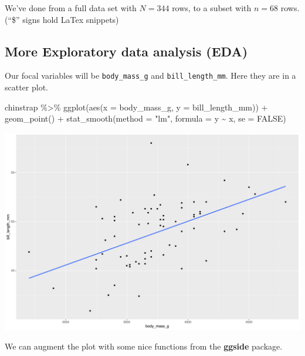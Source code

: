\documentclass[
  letterpaper,
  DIV=11,
  numbers=noendperiod]{scrartcl}
\newenvironment{Shaded}{\begin{snugshade}}{\end{snugshade}}
\newcommand{\AttributeTok}[1]{\textcolor[rgb]{0.40,0.45,0.13}{#1}}
\newcommand{\ConstantTok}[1]{\textcolor[rgb]{0.56,0.35,0.01}{#1}}
\newcommand{\FunctionTok}[1]{\textcolor[rgb]{0.28,0.35,0.67}{#1}}
\newcommand{\NormalTok}[1]{\textcolor[rgb]{0.00,0.23,0.31}{#1}}
\newcommand{\SpecialCharTok}[1]{\textcolor[rgb]{0.37,0.37,0.37}{#1}}
\newcommand{\StringTok}[1]{\textcolor[rgb]{0.13,0.47,0.30}{#1}}
\begin{document}
We've done from a full data set with \(N = 344\) rows, to a subset with
\(n = 68\) rows. (``\$'' signs hold LaTex snippets)

\subsection{More Exploratory data analysis
(EDA)}\label{more-exploratory-data-analysis-eda}

Our focal variables will be \texttt{body\_mass\_g} and
\texttt{bill\_length\_mm}. Here they are in a scatter plot.

\begin{Shaded}
\begin{Highlighting}[]
\NormalTok{chinstrap }\SpecialCharTok{\%\textgreater{}\%} 
  \FunctionTok{ggplot}\NormalTok{(}\FunctionTok{aes}\NormalTok{(}\AttributeTok{x =}\NormalTok{ body\_mass\_g, }\AttributeTok{y =}\NormalTok{ bill\_length\_mm)) }\SpecialCharTok{+}
  \FunctionTok{geom\_point}\NormalTok{() }\SpecialCharTok{+}
  \FunctionTok{stat\_smooth}\NormalTok{(}\AttributeTok{method =} \StringTok{"lm"}\NormalTok{, }\AttributeTok{formula =} \StringTok{\textquotesingle{}y \textasciitilde{} x\textquotesingle{}}\NormalTok{, }\AttributeTok{se =} \ConstantTok{FALSE}\NormalTok{)}
\end{Highlighting}
\end{Shaded}

\includegraphics{Bayes_Lab_1_files/figure-pdf/unnamed-chunk-5-1.pdf}

We can augment the plot with some nice functions from the
\textbf{ggside} package.
\end{document}
